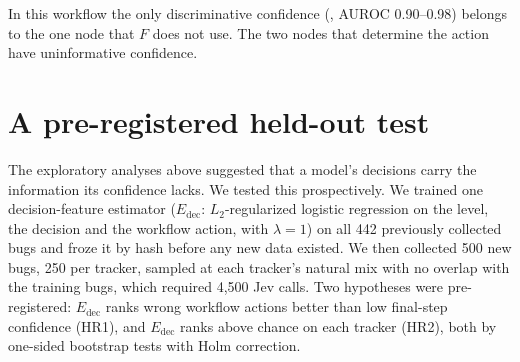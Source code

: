 \begin{widefigure}
\centering
{}
\caption{Adding confidence-ranked escalations on top of decision
composition. At $k = 0$ the curve is S1. Neither ranking consistently
improves on random selection of the same number of cases: deviations are
a few points at most and change sign between rankings and trackers. For
example, per-primitive ranks run slightly above random on Mozilla for
$k \approx 15$--$35$, and the confidence product runs below.}
\label{fig:override}
\end{widefigure}

 In this workflow the only discriminative
confidence (\choice{}, AUROC 0.90--0.98) belongs to the one node that $F$
does not use. The two nodes that determine the action have
uninformative confidence.

\section{A pre-registered held-out test}
\label{sec:heldout}

 The exploratory analyses above suggested that a model's
decisions carry the information its confidence lacks. We tested
this prospectively. We trained one decision-feature estimator
($E_{\text{dec}}$: $L_2$-regularized logistic regression on the
\score{} level, the \noul{} decision and the workflow action, with
$\lambda = 1$) on all 442 previously collected bugs and froze it by hash
before any new data existed. We then collected 500 new bugs, 250 per
tracker, sampled at each tracker's natural mix with no overlap
with the training bugs, which required 4{,}500 Jev calls. Two hypotheses
were pre-registered: $E_{\text{dec}}$ ranks wrong workflow actions
better than low final-step confidence (HR1), and $E_{\text{dec}}$ ranks
above chance on each tracker (HR2), both by one-sided bootstrap tests
with Holm correction.

